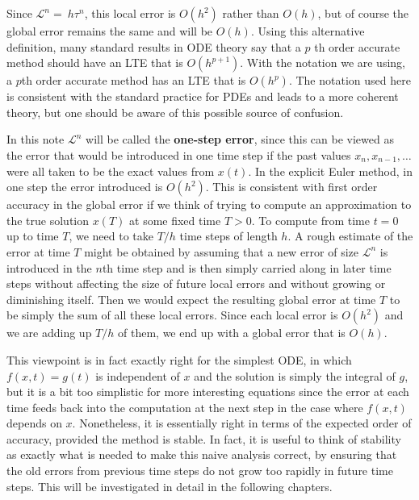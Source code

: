 Since $\mathcal{L}^n=\ h \tau^n$, this local error is $O\left(h^2\right)$ rather than $O\left(h\right)$, but of course the global error remains the same and will be $O\left(h\right)$. Using this alternative definition, many standard results in ODE theory say that a $p$ th order accurate method should have an LTE that is $O\left(h^{p+1}\right)$. With the notation we are using, a $p$th order accurate method has an LTE that is $O\left(h^p\right)$. The notation used here is consistent with the standard practice for PDEs and leads to a more coherent theory, but one should be aware of this possible source of confusion. 

In this note $\mathcal{L}^n$ will be called the \textbf{one-step error}, since this can be viewed as the error that would be introduced in one time step if the past values $x_n, x_{n-1}, \ldots$ were all taken to be the exact values from $x(t)$. In the explicit Euler method, in one step the error introduced is $ O(h^{2} ) $. This is consistent with first order accuracy in the global error if we think of trying to compute an approximation to the true solution $x(T)$ at some fixed time $T>0$. To compute from time $t=0$ up to time $T$, we need to take $T / h$ time steps of length $h$. A rough estimate of the error at time $T$ might be obtained by assuming that a new error of size $\mathcal{L}^n$ is introduced in the $n$th time step and is then simply carried along in later time steps without affecting the size of future local errors and without growing or diminishing itself. Then we would expect the resulting global error at time $T$ to be simply the sum of all these local errors. Since each local error is $O\left(h^{2} \right)$ and we are adding up $T / h$ of them, we end up with a global error that is $O\left(h\right)$. 

This viewpoint is in fact exactly right for the simplest ODE, in which $f(x, t)=g(t)$ is independent of $x$ and the solution is simply the integral of $g$, but it is a bit too simplistic for more interesting equations since the error at each time feeds back into the computation at the next step in the case where $f(x, t)$ depends on $x$. Nonetheless, it is essentially right in terms of the expected order of accuracy, provided the method is stable. In fact, it is useful to think of stability as exactly what is needed to make this naive analysis correct, by ensuring that the old errors from previous time steps do not grow too rapidly in future time steps. This will be investigated in detail in the following chapters.

 
 